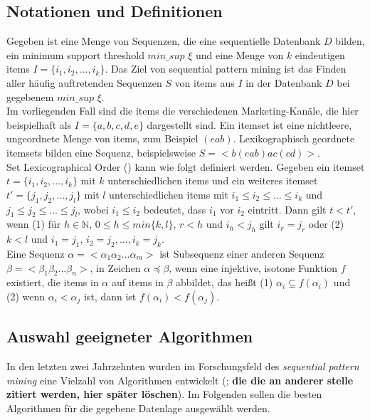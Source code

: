 \subsection{Notationen und Definitionen}
Gegeben ist eine Menge von Sequenzen, die eine sequentielle Datenbank $D$ bilden, ein minimum support threshold $min\_sup$ $\xi$ und eine Menge von $k$ eindeutigen items $I=\{i_1,i_2,...,i_k\}$. Das Ziel von sequential pattern mining ist das Finden aller häufig auftretenden Sequenzen $S$ von items aus $I$ in der Datenbank $D$ bei gegebenem $min\_sup$ $\xi$.\\
Im vorliegenden Fall sind die items die verschiedenen Marketing-Kanäle, die hier beispielhaft als $I=\{a,b,c,d,e\}$ dargestellt sind. Ein itemset ist eine nichtleere, ungeordnete Menge von items, zum Beispiel $(eab)$. Lexikographisch geordnete itemsets bilden eine Sequenz, beispielsweise $S=<b(eab)ac(cd)>$.\\
Set Lexicographical Order (\cite{lexico}) kann wie folgt definiert werden. Gegeben ein itemset $t=\{i_1,i_2,...,i_k\}$ mit $k$ unterschiedlichen items und ein weiteres itemset $t'=\{j_1,j_2,...,j_l\}$ mit $l$ unterschiedlichen items mit $i_1\le i_2\le ...\le i_k$ und $j_1\le j_2\le ... \le j_l$, wobei $i_1\le i_2$ bedeutet, dass $i_1$ vor $i_2$ eintritt. Dann gilt $t<t'$, wenn (1) für $h\in\mathbb{N}$, $0\le h\le min\{k,l\}$, $r<h$ und $i_h<j_h$ gilt $i_r=j_r$ oder (2) $k<l$ und $i_1=j_1$, $i_2=j_2,...,i_k=j_k$.\\
Eine Sequenz $\alpha=<\alpha_1\alpha_2...\alpha_m>$ ist Subsequenz einer anderen Sequenz $\beta=<\beta_1\beta_2...\beta_n>$, in Zeichen $\alpha\preceq\beta$, wenn eine injektive, isotone Funktion $f$ existiert, die items in $\alpha$ auf items in $\beta$ abbildet, das heißt (1) $\alpha_i\subseteq f(\alpha_i)$ und (2) wenn $\alpha_i<\alpha_j$ ist, dann ist $f(\alpha_i)<f(\alpha_j)$.


\subsection{Auswahl geeigneter Algorithmen}

In den letzten zwei Jahrzehnten wurden im Forschungsfeld des \textit{sequential pattern mining} eine Vielzahl von Algorithmen entwickelt (\cite{hvsm,lapin,aprioriall,gsp,psp,spam,freespan,prefixspan,wapmine,fsminer,discall,spade,plwap}; \textbf{die die an anderer stelle zitiert werden, hier später löschen}). Im Folgenden sollen die besten Algorithmen für die gegebene Datenlage ausgewählt werden.
